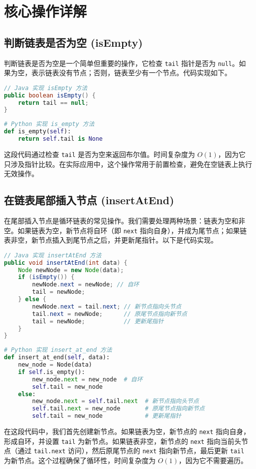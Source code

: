 \section{核心操作详解}
\subsection{判断链表是否为空 (isEmpty)}
判断链表是否为空是一个简单但重要的操作，它检查 \texttt{tail} 指针是否为 \texttt{null}。如果为空，表示链表没有节点；否则，链表至少有一个节点。代码实现如下。\par
\begin{lstlisting}[language=java]
// Java 实现 isEmpty 方法
public boolean isEmpty() {
    return tail == null;
}
\end{lstlisting}
\begin{lstlisting}[language=python]
# Python 实现 is_empty 方法
def is_empty(self):
    return self.tail is None
\end{lstlisting}
这段代码通过检查 \texttt{tail} 是否为空来返回布尔值。时间复杂度为 $O(1)$，因为它只涉及指针比较。在实际应用中，这个操作常用于前置检查，避免在空链表上执行无效操作。\par
\subsection{在链表尾部插入节点 (insertAtEnd)}
在尾部插入节点是循环链表的常见操作。我们需要处理两种场景：链表为空和非空。如果链表为空，新节点将自环（即 \texttt{next} 指向自身），并成为尾节点；如果链表非空，新节点插入到尾节点之后，并更新尾指针。以下是代码实现。\par
\begin{lstlisting}[language=java]
// Java 实现 insertAtEnd 方法
public void insertAtEnd(int data) {
    Node newNode = new Node(data);
    if (isEmpty()) {
        newNode.next = newNode; // 自环
        tail = newNode;
    } else {
        newNode.next = tail.next; // 新节点指向头节点
        tail.next = newNode;      // 原尾节点指向新节点
        tail = newNode;           // 更新尾指针
    }
}
\end{lstlisting}
\begin{lstlisting}[language=python]
# Python 实现 insert_at_end 方法
def insert_at_end(self, data):
    new_node = Node(data)
    if self.is_empty():
        new_node.next = new_node  # 自环
        self.tail = new_node
    else:
        new_node.next = self.tail.next  # 新节点指向头节点
        self.tail.next = new_node       # 原尾节点指向新节点
        self.tail = new_node            # 更新尾指针
\end{lstlisting}
在这段代码中，我们首先创建新节点。如果链表为空，新节点的 \texttt{next} 指向自身，形成自环，并设置 \texttt{tail} 为新节点。如果链表非空，新节点的 \texttt{next} 指向当前头节点（通过 \texttt{tail.next} 访问），然后原尾节点的 \texttt{next} 指向新节点，最后更新 \texttt{tail} 为新节点。这个过程确保了循环性，时间复杂度为 $O(1)$，因为它不需要遍历。\par
